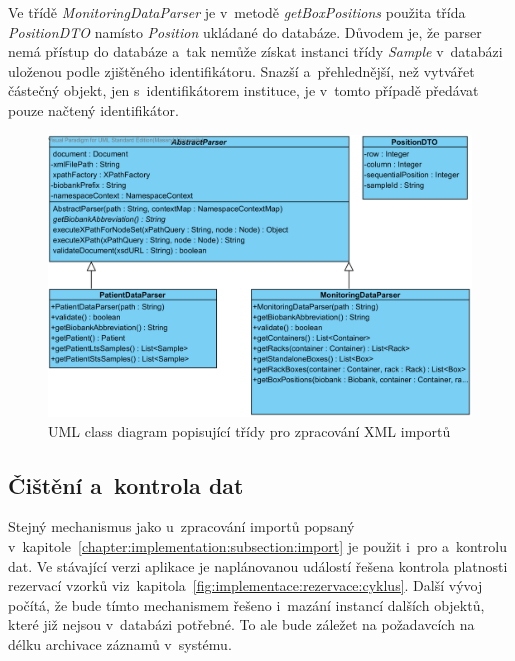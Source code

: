 \documentclass[11pt, draft, oneside]{fithesis2}
\begin{document}
Ve třídě \textit{MonitoringDataParser} je v~metodě \textit{getBoxPositions} použita třída \textit{PositionDTO} namísto \textit{Position} ukládané do databáze. Důvodem je, že parser nemá přístup do databáze a~tak nemůže získat instanci třídy \textit{Sample} v~databázi uloženou podle zjištěného identifikátoru. Snazší a~přehlednější, než vytvářet částečný objekt, jen s~identifikátorem instituce, je v~tomto případě předávat pouze načtený identifikátor. 

\begin{figure}[h!]
\begin{center}
	\includegraphics[width=\textwidth]{ParserView}
\caption{UML class diagram popisující třídy pro zpracování XML importů}
\label{fig:index:uml:class:parser}
\end{center}
\end{figure}

\subsection{Čištění a~kontrola dat}
Stejný mechanismus jako u~zpracování importů popsaný v~kapitole~\ref{chapter:implementation:subsection:import} je použit i~pro  a~kontrolu dat. Ve stávající verzi aplikace je naplánovanou událostí řešena kontrola platnosti rezervací vzorků viz~kapitola~\ref{fig:implementace:rezervace:cyklus}. 
Další vývoj počítá, že bude tímto mechanismem řešeno i~mazání instancí dalších objektů, které již nejsou v~databázi potřebné. To ale bude záležet na požadavcích na délku archivace záznamů v~systému.

\end{document}
